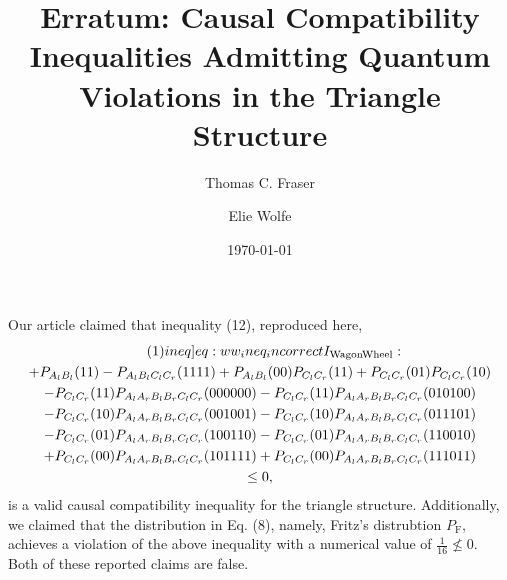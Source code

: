 \documentclass[aps, 10pt, english, twoside, pra, nofootinbib, tightenlines, longbibliography, superscriptaddress, notitlepage]{revtex4-1}
\begin{document}
    \title{Erratum: Causal Compatibility Inequalities Admitting Quantum Violations in the Triangle Structure}
    \author{Thomas C. Fraser}
    \author{Elie Wolfe}
    \date{\today}
    \maketitle
    Our article claimed that inequality (12), reproduced here,
    \begin{equation*}
    \begin{gathered}
        \eq\label[ineq]{eq:ww_ineq_incorrect}
        I\tsb{WagonWheel} : \\
        +P_{A_{l}B_{l}}(11) -P_{A_{l}B_{l}C_{l}C_{r}}(1111) +P_{A_{l}B_{l}}(00) P_{C_{l}C_{r}}(11) +P_{C_{l}C_{r}}(01) P_{C_{l}C_{r}}(10) \\
        -P_{C_{l}C_{r}}(11) P_{A_{l}A_{r}B_{l}B_{r}C_{l}C_{r}}(000000) -P_{C_{l}C_{r}}(11) P_{A_{l}A_{r}B_{l}B_{r}C_{l}C_{r}}(010100) \\
        -P_{C_{l}C_{r}}(10) P_{A_{l}A_{r}B_{l}B_{r}C_{l}C_{r}}(001001) -P_{C_{l}C_{r}}(10) P_{A_{l}A_{r}B_{l}B_{r}C_{l}C_{r}}(011101) \\
        -P_{C_{l}C_{r}}(01) P_{A_{l}A_{r}B_{l}B_{r}C_{l}C_{r}}(100110) -P_{C_{l}C_{r}}(01) P_{A_{l}A_{r}B_{l}B_{r}C_{l}C_{r}}(110010) \\
        +P_{C_{l}C_{r}}(00) P_{A_{l}A_{r}B_{l}B_{r}C_{l}C_{r}}(101111) +P_{C_{l}C_{r}}(00) P_{A_{l}A_{r}B_{l}B_{r}C_{l}C_{r}}(111011) \\
        \leq 0,
    \end{gathered}
    \end{equation*}
    is a valid causal compatibility inequality for the triangle structure. Additionally, we claimed that the distribution in Eq. (8), namely, Fritz's distrubtion $P_{\text{F}}$, achieves a violation of the above inequality with a numerical value of $\frac{1}{16} \not\leq 0$. Both of these reported claims are false. 
\end{document}
